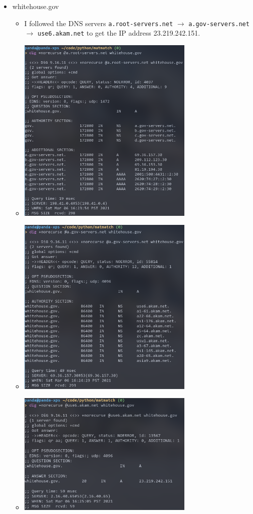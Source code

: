 \documentclass[11pt]{article}
\begin{document}
\begin{enumerate}[label=(\alph*)]
\begin{itemize}
\begin{itemize}
    \end{itemize}
  \item whitehouse.gov
    \begin{itemize}
    \item I followed the DNS servers \texttt{a.root-servers.net} $\rightarrow$
      \texttt{a.gov-servers.net} $\rightarrow$ \texttt{use6.akam.net} to get
      the IP address 23.219.242.151.
    \item \includegraphics[width=0.7\textwidth]{img/dig-whitehouse-1}
    \item \includegraphics[width=0.7\textwidth]{img/dig-whitehouse-2}
    \item \includegraphics[width=0.7\textwidth]{img/dig-whitehouse-3}

\end{itemize}
\end{itemize}
\end{enumerate}
\end{document}
